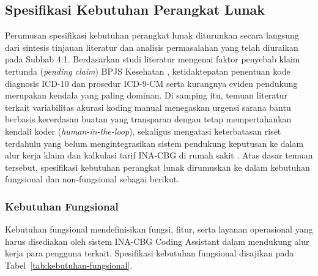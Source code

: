 \subsection{Spesifikasi Kebutuhan Perangkat Lunak}
Perumusan spesifikasi kebutuhan perangkat lunak diturunkan secara langsung dari sintesis tinjauan literatur dan analisis permasalahan yang telah diuraikan pada Subbab 4.1. Berdasarkan studi literatur mengenai faktor penyebab klaim tertunda (\textit{pending claim}) BPJS Kesehatan \cite{10, 16}, ketidaktepatan penentuan kode diagnosis ICD-10 dan prosedur ICD-9-CM serta kurangnya eviden pendukung merupakan kendala yang paling dominan. Di samping itu, temuan literatur terkait variabilitas akurasi koding manual \cite{6} menegaskan urgensi sarana bantu berbasis kecerdasan buatan yang transparan dengan tetap mempertahankan kendali koder (\textit{human-in-the-loop}), sekaligus mengatasi keterbatasan riset terdahulu yang belum mengintegrasikan sistem pendukung keputusan ke dalam alur kerja klaim dan kalkulasi tarif INA-CBG di rumah sakit \cite{18}. Atas dasar temuan tersebut, spesifikasi kebutuhan perangkat lunak dirumuskan ke dalam kebutuhan fungsional dan non-fungsional sebagai berikut.

\subsubsection{Kebutuhan Fungsional}
Kebutuhan fungsional mendefinisikan fungsi, fitur, serta layanan operasional yang harus disediakan oleh sistem INA-CBG Coding Assistant dalam mendukung alur kerja para pengguna terkait. Spesifikasi kebutuhan fungsional disajikan pada Tabel~\ref{tab:kebutuhan-fungsional}.

